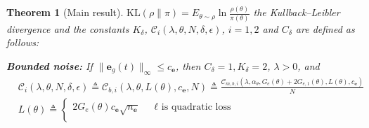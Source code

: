 \documentclass{article}
\def\rve{{\mathbf{e}}}
\newcommand{\KL}{\mathrm{KL}}
\renewcommand{\KL}{\mathrm{KL}}
\newtheorem{theorem}{Theorem}[section]
\newcommand{\e}{\mathbf{e}}
\newcommand{\bE}{\mathbf{E}}
\begin{document}
\begin{theorem}[Main result]
    $\KL(\rho\|\pi)=E_{\theta\sim\rho}\ln\frac{\rho(\theta)}{\pi(\theta)}$ the Kullback–Leibler divergence
    and the constants $K_{\delta}$, 
    $\mathcal{C}_i(\lambda,\theta,N,\delta,\epsilon)$, $i=1,2$ and $C_\delta$ are defined as follows:%

    \textbf{Bounded noise: }
       If %
       $\|\e_g(t)\|_{\infty} \le c_{\rve}$, then $C_{\delta}=1, K_{\delta}=2$, $\lambda > 0$, and %
    \begin{equation*}
    \begin{aligned}
         & \mathcal{C}_i(\lambda, \theta,N, \delta,\epsilon)  \triangleq 
         \mathcal{C}_{b,i}(\lambda,\theta,L(\theta),c_{\rve},N) \triangleq %
         \frac{\mathcal{C}_{m,b,i}(\lambda,\alpha_{\theta},G_e(\theta)+2G_{e,1}(\theta), L(\theta),c_{\rve})}{N} \\
         & L(\theta)   \triangleq \left\{\begin{array}{rl} 2 G_e(\theta)c_{\rve}\sqrt{n_{\rve}} & \mbox{ $\ell$ is quadratic loss} \\


\end{array}
\end{aligned}
\end{equation*}
\end{theorem}
\end{document}
